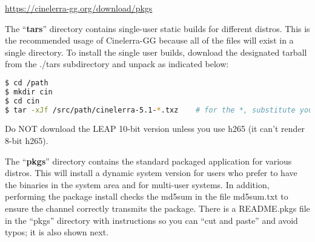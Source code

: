 \url{https://cinelerra-gg.org/download/pkgs}

The “\textbf{tars}” directory contains single-user static builds for different distros.  
This is the recommended usage of Cinelerra-GG because all of the files will exist in a single directory.  
To install the single user builds, download the designated tarball from the ./tars subdirectory and unpack as indicated below:

\begin{lstlisting}[language=bash]
$ cd /path
$ mkdir cin
$ cd cin
$ tar -xJf /src/path/cinelerra-5.1-*.txz    # for the *, substitute your distro tarball name
\end{lstlisting}

Do NOT download the LEAP 10-bit version unless you use h265 (it can't render 8-bit h265).

The “\textbf{pkgs}” directory contains the standard packaged application for various distros.  
This will install a dynamic system version for users who prefer to have the binaries in the system area and for multi-user systems.  
In addition, performing the package install checks the md5sum in the file md5sum.txt to ensure the channel correctly transmits the package.  
There is a README.pkgs file in the “pkgs” directory with instructions so you can “cut and paste” and avoid typos; it is also shown next.


